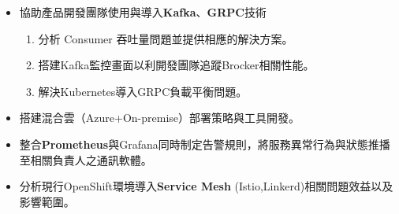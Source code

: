 \begin{experiences}
{\begin{itemize}
                        \item 協助產品開發團隊使用與導入\textbf{Kafka}、\textbf{GRPC}技術
                        \begin{enumerate}
                        	\item 分析 Consumer 吞吐量問題並提供相應的解決方案。
                            \item 搭建Kafka監控畫面以利開發團隊追蹤Brocker相關性能。
                            \item 解決Kubernetes導入GRPC負載平衡問題。
                        \end{enumerate}
                        \item 搭建混合雲（Azure+On-premise）部署策略與工具開發。
                        \item 整合\textbf{Prometheus}與Grafana同時制定告警規則，將服務異常行為與狀態推播至相關負責人之通訊軟體。
                        \item 分析現行OpenShift環境導入\textbf{Service Mesh} (Istio,Linkerd)相關問題效益以及影響範圍。
                        

\end{itemize}}
\end{experiences}
